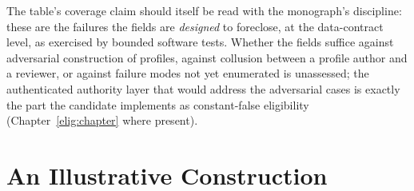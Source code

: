 \begin{threat}\label{ch05:threat:residue}
The table's coverage claim should itself be read with the monograph's
discipline: these are the failures the fields are \emph{designed} to
foreclose, at the data-contract level, as exercised by bounded software
tests. Whether the fields suffice against adversarial construction of
profiles, against collusion between a profile author and a reviewer, or
against failure modes not yet enumerated is unassessed; the authenticated
authority layer that would address the adversarial cases is exactly the
part the candidate implements as constant-false eligibility
(Chapter~\ref{elig:chapter} where present).
\end{threat}

\section{An Illustrative Construction}\label{ch05:construction}

